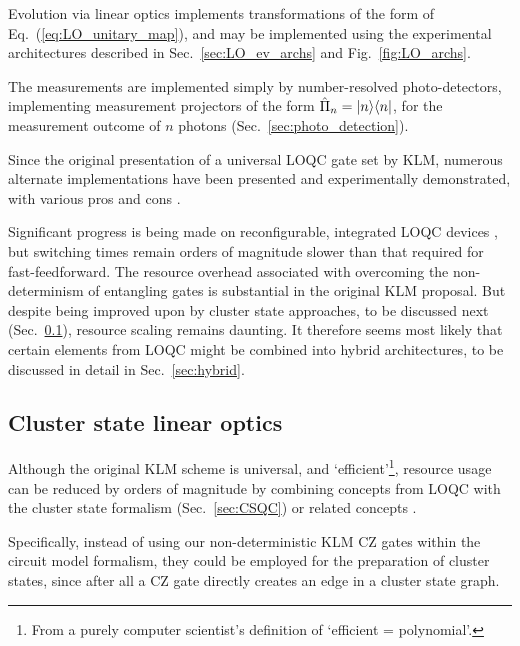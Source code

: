 Evolution via linear optics implements transformations of the form of Eq.~(\ref{eq:LO_unitary_map}), and may be implemented using the experimental architectures described in Sec.~\ref{sec:LO_ev_archs} and Fig.~\ref{fig:LO_archs}.

The measurements are implemented simply by number-resolved photo-detectors, implementing measurement projectors of the form \mbox{$\hat\Pi_n=|n\rangle\langle n|$}, for the measurement outcome of $n$ photons (Sec.~\ref{sec:photo_detection}).

Since the original presentation of a universal LOQC gate set by KLM, numerous alternate implementations have been presented and experimentally demonstrated, with various pros and cons \cite{bib:Ralph01, bib:Pittman01, bib:Ralph02, bib:Knill02, bib:Pittman03, bib:MorYoran06}.

Significant progress is being made on reconfigurable, integrated LOQC devices \cite{bib:carolan2015universal}, but switching times remain orders of magnitude slower than that required for fast-feedforward. The resource overhead associated with overcoming the non-determinism of entangling gates is substantial in the original KLM proposal. But despite being improved upon by cluster state approaches, to be discussed next (Sec.~\ref{sec:CS_LO}), resource scaling remains daunting. It therefore seems most likely that certain elements from LOQC might be combined into hybrid architectures, to be discussed in detail in Sec.~\ref{sec:hybrid}.

%
%

\subsection{Cluster state linear optics} \label{sec:CS_LO} 

Although the original KLM scheme is universal, and `efficient'\footnote{From a purely computer scientist's definition of `efficient = polynomial'.}, resource usage can be reduced by orders of magnitude by combining concepts from LOQC with the cluster state formalism (Sec.~\ref{sec:CSQC}) or related concepts \cite{bib:YoranReznik03, bib:Nielsen04, bib:BrowneRudolph05, bib:GilchristHayes05, bib:Lim05, bib:LimBarrett05}.

Specifically, instead of using our non-deterministic KLM CZ gates within the circuit model formalism, they could be employed for the preparation of cluster states, since after all a CZ gate directly creates an edge in a cluster state graph.

